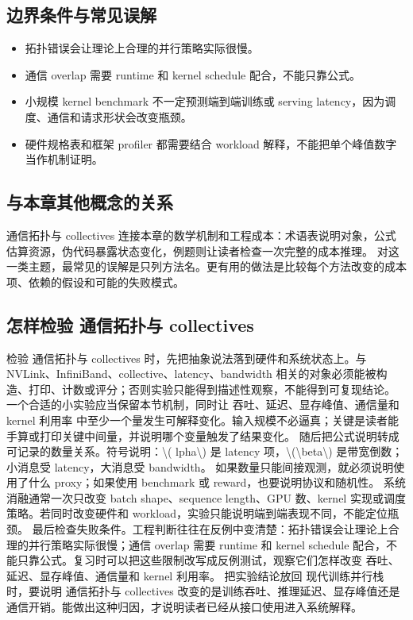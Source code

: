 \documentclass[a4paper]{article}
\begin{document}
\subsection{边界条件与常见误解}
\begin{itemize}
\item 拓扑错误会让理论上合理的并行策略实际很慢。
\item 通信 overlap 需要 runtime 和 kernel schedule 配合，不能只靠公式。
\item 小规模 kernel benchmark 不一定预测端到端训练或 serving latency，因为调度、通信和请求形状会改变瓶颈。
\item 硬件规格表和框架 profiler 都需要结合 workload 解释，不能把单个峰值数字当作机制证明。
\end{itemize}
\subsection{与本章其他概念的关系}
通信拓扑与 collectives 连接本章的数学机制和工程成本：术语表说明对象，公式估算资源，伪代码暴露状态变化，例题则让读者检查一次完整的成本推理。
对这一类主题，最常见的误解是只列方法名。更有用的做法是比较每个方法改变的成本项、依赖的假设和可能的失败模式。
\subsection{怎样检验 通信拓扑与 collectives}
检验 通信拓扑与 collectives 时，先把抽象说法落到硬件和系统状态上。与 NVLink、InfiniBand、collective、latency、bandwidth 相关的对象必须能被构造、打印、计数或评分；否则实验只能得到描述性观察，不能得到可复现结论。
一个合适的小实验应当保留本节机制，同时让 吞吐、延迟、显存峰值、通信量和 kernel 利用率 中至少一个量发生可解释变化。输入规模不必逼真；关键是读者能手算或打印关键中间量，并说明哪个变量触发了结果变化。
随后把公式说明转成可记录的数量关系。符号说明：\textbackslash{}( lpha\textbackslash{}) 是 latency 项，\textbackslash{}(\textbackslash{}beta\textbackslash{}) 是带宽倒数；小消息受 latency，大消息受 bandwidth。 如果数量只能间接观测，就必须说明使用了什么 proxy；如果使用 benchmark 或 reward，也要说明协议和随机性。
系统消融通常一次只改变 batch shape、sequence length、GPU 数、kernel 实现或调度策略。若同时改变硬件和 workload，实验只能说明端到端表现不同，不能定位瓶颈。
最后检查失败条件。工程判断往往在反例中变清楚：拓扑错误会让理论上合理的并行策略实际很慢；通信 overlap 需要 runtime 和 kernel schedule 配合，不能只靠公式。复习时可以把这些限制改写成反例测试，观察它们怎样改变 吞吐、延迟、显存峰值、通信量和 kernel 利用率。
把实验结论放回 现代训练并行栈 时，要说明 通信拓扑与 collectives 改变的是训练吞吐、推理延迟、显存峰值还是通信开销。能做出这种归因，才说明读者已经从接口使用进入系统解释。
\end{document}
